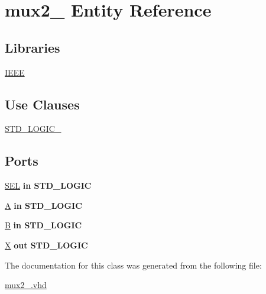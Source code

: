 \hypertarget{classmux2__1}{}\section{mux2\+\_ Entity Reference}
\label{classmux2__1}
\subsection*{Libraries}
 \begin{DoxyCompactItemize}
\item 
\mbox{\label{classmux2__1_aaa6aae5b5585d7ea0be78ee9add9ed3f}} 
\hyperlink{classmux2__1_aaa6aae5b5585d7ea0be78ee9add9ed3f}{I\+E\+EE} 
\end{DoxyCompactItemize}
\subsection*{Use Clauses}
 \begin{DoxyCompactItemize}
\item 
\mbox{\label{classmux2__1_a039aaaa1d1b2b4f4bae0b0727a28811c}} 
\hyperlink{classmux2__1_a039aaaa1d1b2b4f4bae0b0727a28811c}{S\+T\+D\+\_\+\+L\+O\+G\+I\+C\+\_}   
\end{DoxyCompactItemize}
\subsection*{Ports}
 \begin{DoxyCompactItemize}
\item 
\mbox{\label{classmux2__1_a8684595638f5b8f98be8efc51ea5106a}} 
\hyperlink{classmux2__1_a8684595638f5b8f98be8efc51ea5106a}{S\+EL}  {\bfseries {\bfseries \textcolor{vhdlchar}{in}\textcolor{vhdlchar}{ }}} {\bfseries \textcolor{vhdlchar}{S\+T\+D\+\_\+\+L\+O\+G\+IC}\textcolor{vhdlchar}{ }} 
\item 
\mbox{\label{classmux2__1_adeb7d89825218bceeb32336cb4596ba2}} 
\hyperlink{classmux2__1_adeb7d89825218bceeb32336cb4596ba2}{A}  {\bfseries {\bfseries \textcolor{vhdlchar}{in}\textcolor{vhdlchar}{ }}} {\bfseries \textcolor{vhdlchar}{S\+T\+D\+\_\+\+L\+O\+G\+IC}\textcolor{vhdlchar}{ }} 
\item 
\mbox{\label{classmux2__1_ae726f818303beb2456b17b217b6e8dda}} 
\hyperlink{classmux2__1_ae726f818303beb2456b17b217b6e8dda}{B}  {\bfseries {\bfseries \textcolor{vhdlchar}{in}\textcolor{vhdlchar}{ }}} {\bfseries \textcolor{vhdlchar}{S\+T\+D\+\_\+\+L\+O\+G\+IC}\textcolor{vhdlchar}{ }} 
\item 
\mbox{\label{classmux2__1_a0947359e221b1e58716e8dcaf6c2950b}} 
\hyperlink{classmux2__1_a0947359e221b1e58716e8dcaf6c2950b}{X}  {\bfseries {\bfseries \textcolor{vhdlchar}{out}\textcolor{vhdlchar}{ }}} {\bfseries \textcolor{vhdlchar}{S\+T\+D\+\_\+\+L\+O\+G\+IC}\textcolor{vhdlchar}{ }} 
\end{DoxyCompactItemize}


The documentation for this class was generated from the following file\+:\begin{DoxyCompactItemize}
\item 
\hyperlink{mux2__1_8vhd}{mux2\+\_.\+vhd}\end{DoxyCompactItemize}
